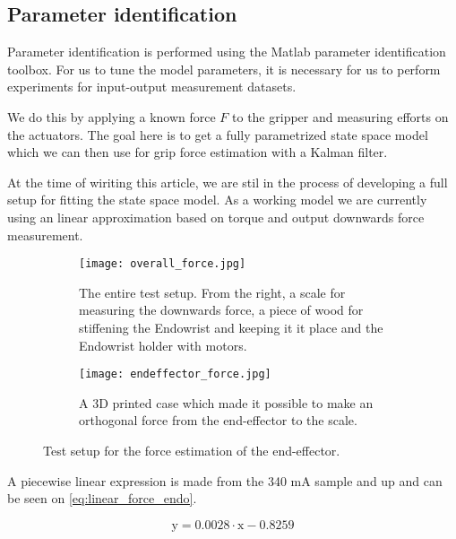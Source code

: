 \subsection{Parameter identification}
Parameter identification is performed using the Matlab parameter identification toolbox.
For us to tune the model parameters, it is necessary for us to perform experiments for input-output measurement datasets.

We do this by applying a known force $F$ to the gripper and measuring efforts on the actuators.
The goal here is to get a fully parametrized state space model which we can then use for grip force estimation with a Kalman filter.

At the time of wiriting this article, we are stil in the process of developing a full setup for fitting the state space model.
As a working model we are currently using an linear approximation based on torque and output downwards force measurement.

\begin{figure}
  \centering
  \begin{subfigure}{.45\linewidth}
    \centering
    \vspace{24pt}
    \texttt{[image: overall\_force.jpg]}
    \caption{The entire test setup. From the right, a scale for measuring the downwards force, a piece of wood for stiffening the Endowrist and keeping it it place and the Endowrist holder with motors.}
    \label{fig:entire_force_testsetup}
  \end{subfigure}
  \begin{subfigure}{.45\linewidth}
    \centering
    \texttt{[image: endeffector\_force.jpg]}
    \caption{A 3D printed case which made it possible to make an orthogonal force from the end-effector to the scale.}
    \label{fig:endeffector_force}
  \end{subfigure}
\caption{Test setup for the force estimation of the end-effector.}
\label{fig:Overview_force}
\end{figure}

A piecewise linear expression is made from the 340 mA sample and up and can be seen on \eqref{eq:linear_force_endo}.

\begin{equation}
\text{y} = 0.0028 \cdot \text{x} -0.8259 
\label{eq:linear_force_endo}
\end{equation} 